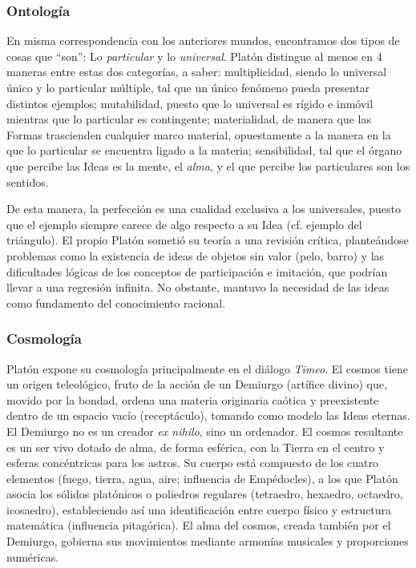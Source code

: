 \documentclass[10pt]{article}
\begin{document}
\subsubsection{Ontología}

En misma correspondencia con los anteriores mundos, encontramos dos tipos de cosas que ``son'': Lo \textit{particular} y lo \textit{universal}. Platón distingue al
menos en 4 maneras entre estas dos categorías, a saber: multiplicidad, siendo lo universal único y lo particular múltiple, tal que un único fenómeno pueda presentar
distintos ejemplos; mutabilidad, puesto que lo universal es rígido e inmóvil mientras que lo particular es contingente; materialidad, de manera que las Formas
trascienden cualquier marco material, opuestamente a la manera en la que lo particular se encuentra ligado a la materia; sensibilidad, tal que el órgano que percibe
las Ideas es la mente, el \textit{alma}, y el que percibe los particulares son los sentidos.

De esta manera, la perfección es una cualidad exclusiva a los universales, puesto que el ejemplo siempre carece de algo respecto a su Idea (cf. ejemplo del triángulo). 
El propio Platón sometió su teoría a una revisión crítica, planteándose problemas como la existencia de ideas de objetos sin valor (pelo, barro) y las dificultades lógicas 
de los conceptos de participación e imitación, que podrían llevar a una regresión infinita. No obstante, mantuvo la necesidad de las ideas como fundamento del conocimiento racional.

\subsubsection{Cosmología}
Platón expone su cosmología principalmente en el diálogo \textit{Timeo}. El cosmos tiene un origen teleológico, fruto de la acción de un Demiurgo (artífice divino) que, movido por la 
bondad, ordena una materia originaria caótica y preexistente dentro de un espacio vacío (receptáculo), tomando como modelo las Ideas eternas. El Demiurgo no es un creador \textit{ex nihilo},
sino un ordenador. El cosmos resultante es un ser vivo dotado de alma, de forma esférica, con la Tierra en el centro y esferas concéntricas para los astros. Su cuerpo está compuesto 
de los cuatro elementos (fuego, tierra, agua, aire; influencia de Empédocles), a los que Platón asocia los sólidos platónicos o poliedros regulares (tetraedro, hexaedro, octaedro, icosaedro),
estableciendo así una identificación entre cuerpo físico y estructura matemática (influencia pitagórica). El alma del cosmos, creada también por el Demiurgo, gobierna sus movimientos mediante
armonías musicales y proporciones numéricas.
\end{document}
